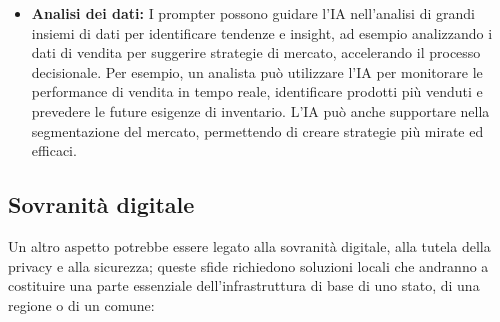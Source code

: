 \begin{itemize}
            \item \textbf{Analisi dei dati:} I prompter possono guidare l'IA nell'analisi di grandi  insiemi di dati per identificare tendenze e insight, ad esempio analizzando i dati di vendita per suggerire strategie di mercato, accelerando il processo decisionale. Per esempio, un analista può utilizzare l'IA per monitorare le performance di vendita in tempo reale, identificare prodotti più venduti e prevedere le future esigenze di inventario. L'IA può anche supportare nella segmentazione del mercato, permettendo di creare strategie più mirate ed efficaci. 
        \end{itemize}
        
    \subsection{Sovranità digitale}
    Un altro aspetto potrebbe essere legato alla sovranità digitale, alla tutela della privacy e alla sicurezza; queste sfide richiedono soluzioni locali che andranno a costituire una parte essenziale dell'infrastruttura di base di uno stato, di una regione o di un comune:

